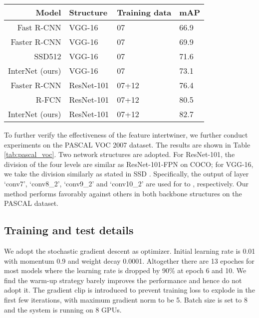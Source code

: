 \documentclass{article} \usepackage{iclr2019_conference,times}
\begin{document}
\begin{table*}[h]
	\centering
	\begin{tabular}{   r |  l l l}
		Model & Structure & Training data & mAP \\ \toprule
		Fast R-CNN \citep{ross15_fast_rcnn} & VGG-16 & 07 & 66.9 \\
		Faster R-CNN \citep{he2016_resnet} & VGG-16 & 07 & 69.9 \\
		SSD512 \citep{liu2015_ssd} & VGG-16 & 07 & 71.6 \\
		InterNet (ours) & VGG-16 & 07 & 73.1 \\ 
		\midrule
		Faster R-CNN \citep{he2016_resnet} & ResNet-101 & 07+12 & 76.4 \\
		R-FCN \citep{dai2016_rfcn} & ResNet-101 & 07+12 & 80.5 \\
		InterNet (ours) & ResNet-101 & 07+12 & 82.7 \\
	\end{tabular}
	\vspace{-.2cm}
	\caption{
{Comparison of our model with feature intertwiner to other methods on PASCAL VOC 2007 test set. Here we adopt two backbone options: ResNet-101 and VGG-16 without FPN to fairly compare with others. The number of levels is 4, the same as on COCO benchmark.}
	}\label{tab:pascal_voc}
\end{table*}

{To 
further verify the effectiveness of the feature intertwiner, we further 
conduct experiments on the PASCAL VOC 2007 dataset. The results are shown in Table \ref{tab:pascal_voc}.
Two network structures are adopted. For ResNet-101, the division of the four levels are similar as ResNet-101-FPN on COCO; for VGG-16, we take the division similarly as stated in SSD \citep{liu2015_ssd}. Specifically, the output of layer `conv7', `conv8\_2', `conv9\_2' and `conv10\_2' are used for  to , respectively.
Our method performs favorably against others in both backbone structures on the PASCAL dataset.}

\subsection{Training and test details}\label{sec:training_test_details}
We adopt the stochastic gradient descent as optimizer. Initial learning rate is 0.01 with momentum 0.9 and weight decay 0.0001. Altogether there are 13 epoches for most models where the learning rate is dropped by 90\% at epoch 6 and 10. We find the warm-up strategy \citep{goyal2017_fast_imagenet_train} barely improves the performance and hence do not adopt it. The gradient clip is introduced to prevent training loss to explode in the first few iterations, with maximum gradient norm to be 5. Batch size is set to 8 and the system is running on 8 GPUs.
\end{document}
